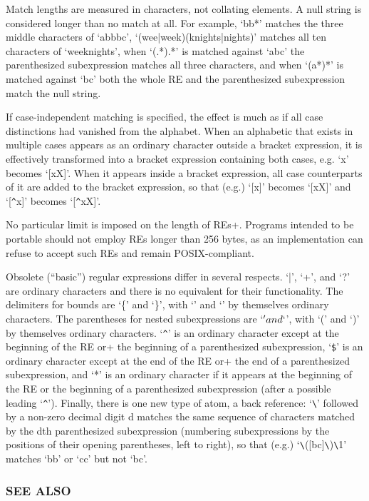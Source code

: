 Match lengths are measured in characters, not collating elements. A
null string is considered longer than no match at all. For example,
`bb*' matches the three middle characters of `abbbc',
`(wee|week)(knights|nights)' matches all ten characters of
`weeknights', when `(.*).*' is matched against `abc' the parenthesized
subexpression matches all three characters, and when `(a*)*' is
matched against `bc' both the whole RE and the parenthesized
subexpression match the null string.

If case-independent matching is specified, the effect is much as if
all case distinctions had vanished from the alphabet. When an
alphabetic that exists in multiple cases appears as an ordinary
character outside a bracket expression, it is effectively transformed
into a bracket expression containing both cases, e.g. `x' becomes
`[xX]'. When it appears inside a bracket expression, all case
counterparts of it are added to the bracket expression, so that (e.g.)
`[x]' becomes `[xX]' and `[\verb|^|x]' becomes `[\verb|^|xX]'.

No particular limit is imposed on the length of REs+. Programs
intended to be portable should not employ REs longer than 256 bytes,
as an implementation can refuse to accept such REs and remain
POSIX-compliant.

Obsolete (``basic'') regular expressions differ in several respects.
`|', `+', and `?' are ordinary characters and there is no equivalent
for their functionality. The delimiters for bounds are `\{' and `\}',
with `{' and `}' by themselves ordinary characters. The parentheses
for nested subexpressions are `\(' and `\)', with `(' and `)' by
themselves ordinary characters. `\verb|^|' is an ordinary character
except at the beginning of the RE or+ the beginning of a parenthesized
subexpression, `\verb|$|' is an ordinary character except at the end
of the RE or+ the end of a parenthesized subexpression, and `*' is an
ordinary character if it appears at the beginning of the RE or the
beginning of a parenthesized subexpression (after a possible leading
`\verb|^|'). Finally, there is one new type of atom, a back reference:
`\verb|\|' followed by a non-zero decimal digit d matches the same sequence
of characters matched by the dth parenthesized subexpression
(numbering subexpressions by the positions of their opening
parentheses, left to right), so that (e.g.)
`\verb|\|([bc]\verb|\|)\verb|\|1' matches `bb' or `cc' but not `bc'.

\subsubsection{SEE ALSO}

